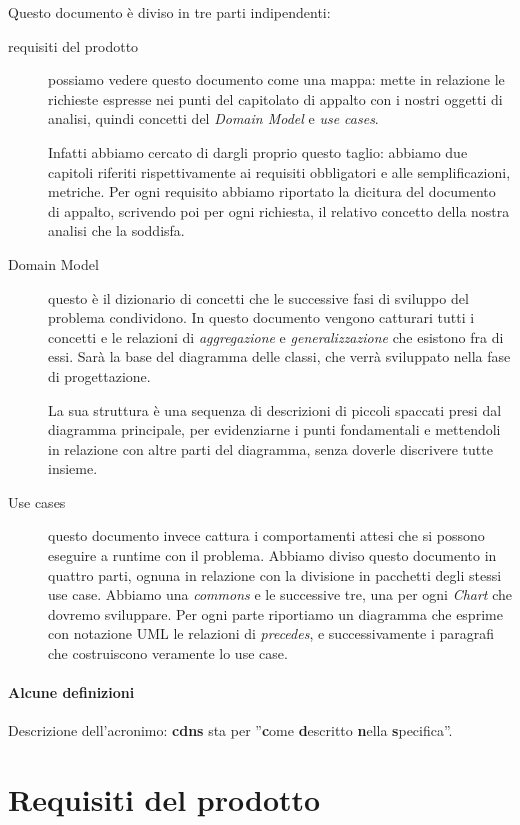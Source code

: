 \documentclass[a4paper, 12pt]{report}
\begin{document}
Questo documento \`e diviso in tre parti indipendenti:
\begin{description}
\item[requisiti del prodotto] possiamo vedere questo documento come una mappa:
mette in relazione le richieste espresse nei punti del capitolato di appalto
con i nostri oggetti di analisi, quindi concetti del \emph{Domain Model} e
\emph{use cases}. 

Infatti abbiamo cercato di dargli proprio questo taglio: abbiamo due capitoli
riferiti rispettivamente ai requisiti obbligatori e alle semplificazioni,
metriche. Per ogni requisito abbiamo riportato la dicitura del documento di
appalto, scrivendo poi per ogni richiesta, il relativo concetto della nostra
analisi che la soddisfa.
\item[Domain Model] questo \`e il dizionario di concetti che le successive fasi
di sviluppo del problema condividono. In questo documento vengono catturari
tutti i concetti e le relazioni di \emph{aggregazione} e
\emph{generalizzazione} che esistono fra di essi. Sar\`a la base del diagramma
delle classi, che verr\`a sviluppato nella fase di progettazione.

La sua struttura \`e una sequenza di descrizioni di piccoli spaccati presi dal
diagramma principale, per evidenziarne i punti fondamentali e mettendoli
in relazione con altre parti del diagramma, senza doverle discrivere tutte
insieme.
\item[Use cases] questo documento invece cattura i comportamenti attesi che si
possono eseguire a runtime con il problema. Abbiamo diviso questo documento in
quattro parti, ognuna in relazione con la divisione in pacchetti degli stessi
use case. Abbiamo una \emph{commons} e le successive tre, una per ogni
\emph{Chart} che dovremo sviluppare. Per ogni parte riportiamo un diagramma che
esprime con notazione UML le relazioni di \emph{precedes}, e successivamente i
paragrafi che costruiscono veramente lo use case.
\end{description}

\subsection*{Alcune definizioni}

Descrizione dell'acronimo: \textbf{cdns} sta per ''\textbf{c}ome
\textbf{d}escritto \textbf{n}ella \textbf{s}pecifica''.

\part{Requisiti del prodotto}
\end{document}
